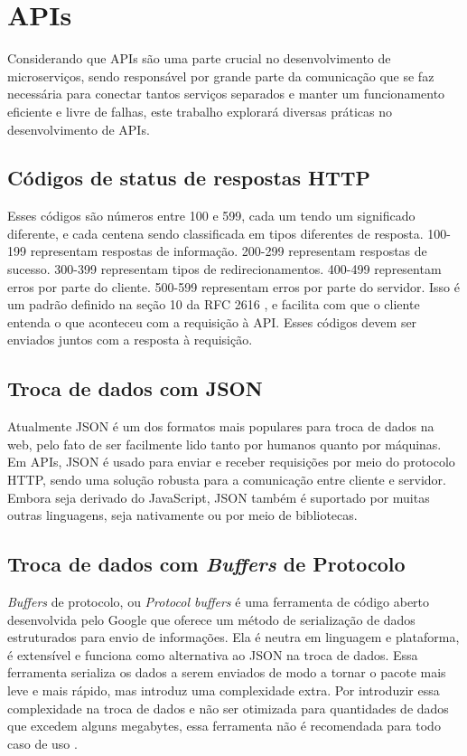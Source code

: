 \section{APIs}\label{boas-praticas-apis}

Considerando que APIs são uma parte crucial no desenvolvimento de microserviços, sendo responsável por grande parte da comunicação que se faz necessária para conectar tantos serviços separados e manter um funcionamento eficiente e livre de falhas, este trabalho explorará diversas práticas no desenvolvimento de APIs.

\subsection{Códigos de status de respostas HTTP}
Esses códigos são números entre 100 e 599, cada um tendo um significado diferente, e cada centena sendo classificada em tipos diferentes de resposta. 100-199 representam respostas de informação. 200-299 representam respostas de sucesso. 300-399 representam tipos de redirecionamentos. 400-499 representam erros por parte do cliente. 500-599 representam erros por parte do servidor. Isso é um padrão definido na seção 10 da RFC 2616 \cite{rfc_http_nielsen_1999}, e facilita com que o cliente entenda o que aconteceu com a requisição à API. Esses códigos devem ser enviados juntos com a resposta à requisição.

\subsection{Troca de dados com JSON}
Atualmente JSON é um dos formatos mais populares para troca de dados na web, pelo fato de ser facilmente lido tanto por humanos quanto por máquinas. Em APIs, JSON é usado para enviar e receber requisições por meio do protocolo HTTP, sendo uma solução robusta para a comunicação entre cliente e servidor. Embora seja derivado do JavaScript, JSON também é suportado por muitas outras linguagens, seja nativamente ou por meio de bibliotecas.  \cite{json_bourhis_2020}

\subsection{Troca de dados com \emph{Buffers} de Protocolo}\label{subsessao-protocol-buffers}
\emph{Buffers} de protocolo, ou \emph{Protocol buffers} é uma ferramenta de código aberto desenvolvida pelo Google que oferece um método de serialização de dados estruturados para envio de informações. Ela é neutra em linguagem e plataforma, é extensível e funciona como alternativa ao JSON na troca de dados. Essa ferramenta serializa os dados a serem enviados de modo a tornar o pacote mais leve e mais rápido, mas introduz uma complexidade extra. Por introduzir essa complexidade na troca de dados e não ser otimizada para quantidades de dados que excedem alguns megabytes, essa ferramenta não é recomendada para todo caso de uso \cite{google-protocol-buffers}.

